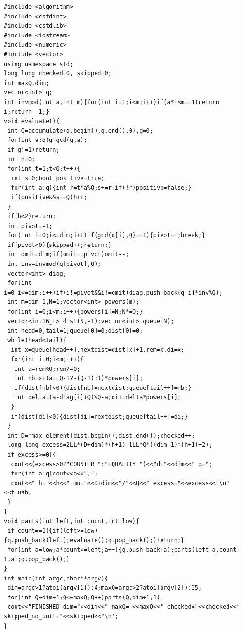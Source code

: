 \documentclass[11pt,a4paper]{article}
\theoremstyle{remark}\newtheorem{remark}[theorem]{Remark}
\begin{document}
\begin{Verbatim}[fontsize=\scriptsize]
#include <algorithm>
#include <cstdint>
#include <cstdlib>
#include <iostream>
#include <numeric>
#include <vector>
using namespace std;
long long checked=0, skipped=0;
int maxQ,dim;
vector<int> q;
int invmod(int a,int m){for(int i=1;i<m;i++)if(a*i%m==1)return i;return -1;}
void evaluate(){
 int Q=accumulate(q.begin(),q.end(),0),g=0;
 for(int a:q)g=gcd(g,a);
 if(g!=1)return;
 int h=0;
 for(int t=1;t<Q;t++){
  int s=0;bool positive=true;
  for(int a:q){int r=t*a%Q;s+=r;if(!r)positive=false;}
  if(positive&&s==Q)h++;
 }
 if(h<2)return;
 int pivot=-1;
 for(int i=0;i<=dim;i++)if(gcd(q[i],Q)==1){pivot=i;break;}
 if(pivot<0){skipped++;return;}
 int omit=dim;if(omit==pivot)omit--;
 int inv=invmod(q[pivot],Q);
 vector<int> diag;
 for(int i=0;i<=dim;i++)if(i!=pivot&&i!=omit)diag.push_back(q[i]*inv%Q);
 int m=dim-1,N=1;vector<int> powers(m);
 for(int i=0;i<m;i++){powers[i]=N;N*=Q;}
 vector<int16_t> dist(N,-1);vector<int> queue(N);
 int head=0,tail=1;queue[0]=0;dist[0]=0;
 while(head<tail){
  int x=queue[head++],nextdist=dist[x]+1,rem=x,di=x;
  for(int i=0;i<m;i++){
   int a=rem%Q;rem/=Q;
   int nb=x+(a==Q-1?-(Q-1):1)*powers[i];
   if(dist[nb]<0){dist[nb]=nextdist;queue[tail++]=nb;}
   int delta=(a-diag[i]+Q)%Q-a;di+=delta*powers[i];
  }
  if(dist[di]<0){dist[di]=nextdist;queue[tail++]=di;}
 }
 int D=*max_element(dist.begin(),dist.end());checked++;
 long long excess=2LL*(D+dim)*(h+1)-1LL*Q*((dim-1)*(h+1)+2);
 if(excess>=0){
  cout<<(excess>0?"COUNTER ":"EQUALITY ")<<"d="<<dim<<" q=";
  for(int a:q)cout<<a<<",";
  cout<<" h="<<h<<" mu="<<D+dim<<"/"<<Q<<" excess="<<excess<<"\n"<<flush;
 }
}
void parts(int left,int count,int low){
 if(count==1){if(left>=low){q.push_back(left);evaluate();q.pop_back();}return;}
 for(int a=low;a*count<=left;a++){q.push_back(a);parts(left-a,count-1,a);q.pop_back();}
}
int main(int argc,char**argv){
 dim=argc>1?atoi(argv[1]):4;maxQ=argc>2?atoi(argv[2]):35;
 for(int Q=dim+1;Q<=maxQ;Q++)parts(Q,dim+1,1);
 cout<<"FINISHED dim="<<dim<<" maxQ="<<maxQ<<" checked="<<checked<<" skipped_no_unit="<<skipped<<"\n";
}
\end{Verbatim}
\clearpage
\pagestyle{fancy}
\end{document}
